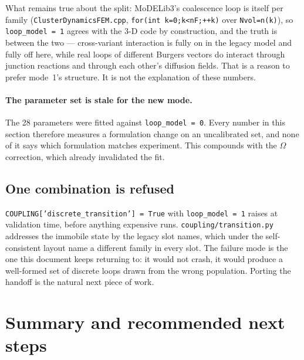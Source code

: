 \documentclass[11pt,a4paper]{article}
\newcommand{\code}[1]{\texttt{\small #1}}
\begin{document}
What remains true about the split: MoDELib3's coalescence loop is itself per
family (\code{ClusterDynamicsFEM.cpp}, \code{for(int k=0;k<nF;++k)} over
\code{Nvol=n(k)}), so \code{loop\_model = 1} agrees with the 3-D code by
construction, and the truth is between the two --- cross-variant interaction is
fully on in the legacy model and fully off here, while real loops of different
Burgers vectors do interact through junction reactions and through each other's
diffusion fields. That is a reason to prefer mode~1's structure. It is not the
explanation of these numbers.

\paragraph{The parameter set is stale for the new mode.} The 28 parameters were
fitted against \code{loop\_model = 0}. Every number in this section therefore
measures a formulation change on an uncalibrated set, and none of it says which
formulation matches experiment. This compounds with the $\Omega$ correction,
which already invalidated the fit.

\subsection{One combination is refused}

\code{COUPLING['discrete\_transition'] = True} with \code{loop\_model = 1}
raises at validation time, before anything expensive runs.
\code{coupling/transition.py} addresses the immobile state by the legacy slot
names, which under the self-consistent layout name a different family in every
slot. The failure mode is the one this document keeps returning to: it would not
crash, it would produce a well-formed set of discrete loops drawn from the wrong
population. Porting the handoff is the natural next piece of work.

\section{Summary and recommended next steps}
\end{document}
